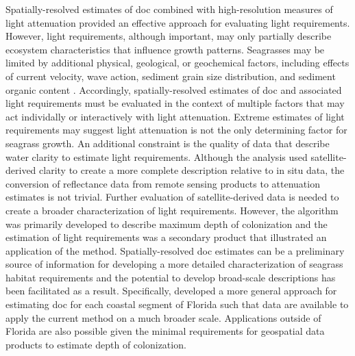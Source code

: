 \documentclass[letterpaper,12pt,oneside]{article}\usepackage[]{graphicx}\usepackage[]{color}
\begin{document}
Spatially-resolved estimates of \ac{doc} combined with high-resolution measures of light attenuation provided an effective approach for evaluating light requirements. However, light requirements, although important, may only partially describe ecosystem characteristics that influence growth patterns.  Seagrasses may be limited by additional physical, geological, or geochemical factors, including effects of current velocity, wave action, sediment grain size distribution, and sediment organic content \citep{Koch01}.  Accordingly, spatially-resolved estimates of \ac{doc} and associated light requirements must be evaluated in the context of multiple factors that may act individally or interactively with light attenuation.  Extreme estimates of light requirements may suggest light attenuation is not the only determining factor for seagrass growth.  An additional constraint is the quality of data that describe water clarity to estimate light requirements.  Although the analysis used satellite-derived clarity to create a more complete description relative to in situ data, the conversion of reflectance data from remote sensing products to attenuation estimates is not trivial.  Further evaluation of satellite-derived data is needed to create a broader characterization of light requirements.  However, the algorithm was primarily developed to describe maximum depth of colonization and the estimation of light requirements was a secondary product that illustrated an application of the method.  Spatially-resolved \ac{doc} estimates can be a preliminary source of information for developing a more detailed characterization of seagrass habitat requirements and the potential to develop broad-scale descriptions has been facilitated as a result.  Specifically,  developed a more general approach for estimating \ac{doc} for each coastal segment of Florida such that data are available to apply the current method on a much broader scale.  Applications outside of Florida are also possible given the minimal requirements for geospatial data products to estimate depth of colonization.  

\clearpage
\begin{singlespace}


\end{singlespace}
\clearpage

\end{document}
